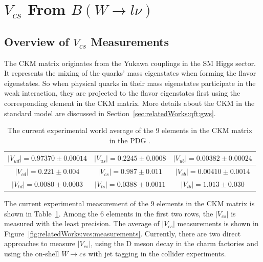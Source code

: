 
\section{$V_{cs}$ From $B(W\to l \nu)$ }
\label{sec:relatedWorks:vcs}

\subsection{Overview of $V_{cs}$ Measurements}

The CKM matrix originates from the Yukawa couplings in the SM Higgs sector. It represents the mixing of the quarks' mass eigenstates when forming the flavor eigenstates. So when physical quarks in their mass eigenstates participate in the weak interaction, they are projected to the flavor eigenstates first using the corresponding element in the CKM matrix. More details about the CKM in the standard model are discussed in Section~\ref{sec:relatedWorks:qft:gws}. 

\begin{table}[ht]
    \centering
    \setlength{\tabcolsep}{1.5em}
    \renewcommand{\arraystretch}{1.5}
    \begin{tabular}{c|c|c }
        \hline
         $|V_{ud}|=0.97370 \pm 0.00014 $         & $|V_{us}|=0.2245 \pm 0.0008$       &  $|V_{ub}|=0.00382 \pm 0.00024$         \\ \hline
       $|V_{cd}|=0.221 \pm 0.004 $                    & $|V_{cs}|=0.987 \pm 0.011$       &  $|V_{cb}|=0.00410 \pm 0.0014$                    \\ \hline
       $|V_{td}|=0.0080 \pm 0.0003 $               & $|V_{ts}|=0.0388 \pm 0.0011$       &  $|V_{tb}|=1.013 \pm 0.030$                    \\
        \hline
    \end{tabular}
    \caption{The current experimental world average of the 9 elements in the CKM matrix in the PDG \cite{pdg2020}.  }
    \label{tab:relatedWorks:vcs:ckm}
\end{table}


The current experimental measurement of the 9 elements in the CKM matrix \cite{pdg2020} is shown in Table~\ref{tab:relatedWorks:vcs:ckm}. Among the 6 elements in the first two rows, the $|V_{cs}|$ is measured with the least precision. The average of $|V_{cs}|$ measurements is shown in Figure~\ref{fig:relatedWorks:vcs:measurements}. Currently, there are two direct approaches to measure $|V_{cs}|$, using the D meson decay in the charm factories and using the on-shell $W\to c s$  with jet tagging in the collider experiments.


